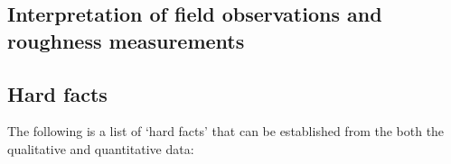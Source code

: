 \documentclass[12pt,a4paper]{article}
\begin{document}
\begin{itemize}
\section{Interpretation of field observations and roughness measurements}


\subsection{Hard facts}

The following is a list of  `hard facts' that can be established from the both the qualitative and quantitative data:


\end{itemize}
\end{document}
